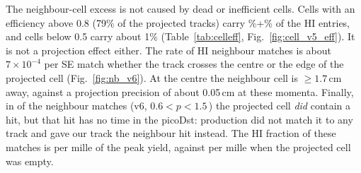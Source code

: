 The neighbour-cell excess is not caused by dead or inefficient cells. Cells with an efficiency above 0.8 (79\% of the
projected tracks) carry \clShared\%+\clSharee\% of the HI entries, and cells below 0.5 carry about 1\%
(Table~\ref{tab:celleff}, Fig.~\ref{fig:cell_v5_eff}). It is not a projection effect either.
The rate of HI neighbour matches is about $7\times10^{-4}$ per SE match whether the track crosses the centre or the
edge of the projected cell (Fig.~\ref{fig:nb_v6}). At the centre the neighbour cell is $\ge1.7$\,cm away, against a
projection precision of about 0.05\,cm at these momenta. Finally, in \nbStUntN{} of the \nbStTotN{}
neighbour matches (v6, $0.6<p<1.5$\,\GeVc) the projected cell \emph{did} contain a hit, but that hit has no time in
the picoDst: production did not match it to any track and gave our track the neighbour hit instead.
The HI fraction of these matches is \nbStUntHIPK{} per mille of the peak yield, against \nbStEmptyHIPK{} per mille when
the projected cell was empty.

\begin{table}[H]
\centering
\caption{HI yield ($1.6<m^2<2.8$\,GeV$^2$/$c^4$) per $10^4$ projected tracks for SE and overlay ME (projected cell
first, all hits), by category. ``share'' is the category's share of all SE matches.
$^{*}$Hit variables: absolute counts instead of rates, because projected tracks cannot be assigned to them.
Generated: .}
\label{tab:bkgcat}
\scriptsize

\end{table}

\begin{table}[H]
\centering
\caption{HI yield by cell efficiency $\varepsilon_c$ (fraction of tracks projected to the cell for which the cell
has a hit), $0.6<p<3$\,\GeVc. ``nb.\ match'': share of the projected tracks matched to a neighbour cell.
Generated: .}
\label{tab:celleff}
\small

\end{table}

